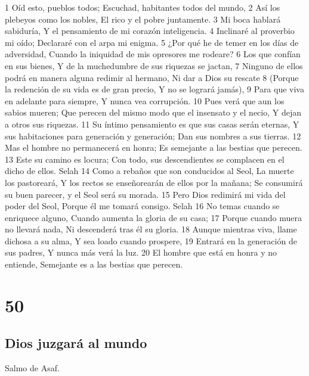 1 Oíd esto, pueblos todos;
Escuchad, habitantes todos del mundo,
2 Así los plebeyos como los nobles,
El rico y el pobre juntamente.
3 Mi boca hablará sabiduría,
Y el pensamiento de mi corazón inteligencia.
4 Inclinaré al proverbio mi oído;
Declararé con el arpa mi enigma.
5 ¿Por qué he de temer en los días de adversidad,
Cuando la iniquidad de mis opresores me rodeare?
6 Los que confían en sus bienes,
Y de la muchedumbre de sus riquezas se jactan,
7 Ninguno de ellos podrá en manera alguna redimir al hermano,
Ni dar a Dios su rescate
8 (Porque la redención de su vida es de gran precio,
Y no se logrará jamás),
9 Para que viva en adelante para siempre,
Y nunca vea corrupción.
10 Pues verá que aun los sabios mueren;
Que perecen del mismo modo que el insensato y el necio,
Y dejan a otros sus riquezas.
11 Su íntimo pensamiento es que sus casas serán eternas,
Y sus habitaciones para generación y generación;
Dan sus nombres a sus tierras.
12 Mas el hombre no permanecerá en honra;
Es semejante a las bestias que perecen.
13 Este su camino es locura;
Con todo, sus descendientes se complacen en el dicho de ellos. Selah
14 Como a rebaños que son conducidos al Seol,
La muerte los pastoreará,
Y los rectos se enseñorearán de ellos por la mañana;
Se consumirá su buen parecer, y el Seol será su morada.
15 Pero Dios redimirá mi vida del poder del Seol,
Porque él me tomará consigo. Selah
16 No temas cuando se enriquece alguno,
Cuando aumenta la gloria de su casa;
17 Porque cuando muera no llevará nada,
Ni descenderá tras él su gloria.
18 Aunque mientras viva, llame dichosa a su alma,
Y sea loado cuando prospere,
19 Entrará en la generación de sus padres,
Y nunca más verá la luz.
20 El hombre que está en honra y no entiende,
Semejante es a las bestias que perecen.

\chapter{50}

\section*{Dios juzgará al mundo}

Salmo de Asaf.

